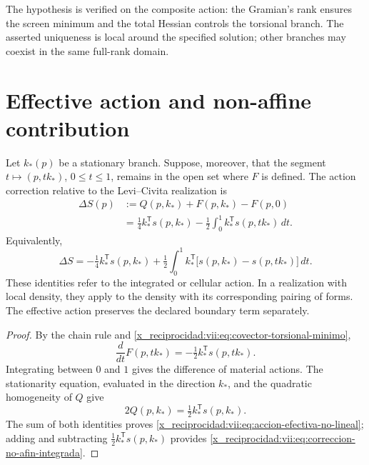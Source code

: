 The hypothesis is verified on the composite action: the Gramian's
rank ensures the screen minimum and the total Hessian controls
the torsional branch. The asserted uniqueness is local around the
specified solution; other branches may coexist in the same
full-rank domain.

\section{Effective action and non-affine contribution}
\label{x_reciprocidad:vii:subsec:accion-efectiva-no-afin}

\begin{theorem}
\label{x_reciprocidad:vii:thm:eliminacion-torsional-no-lineal}
Let \(k_*(p)\) be a stationary branch. Suppose, moreover, that the
segment \(t\mapsto (p,tk_*)\), \(0\leq t\leq1\), remains
in the open set where \(F\) is defined. The action correction
relative to the Levi--Civita realization is
\begin{equation}
 \begin{split}
 \Delta S(p)
  &:=Q(p,k_*)+F(p,k_*)-F(p,0)\\
  &=\tfrac14 k_*^{\mathsf T}s(p,k_*)
     -\tfrac12\int_0^1
           k_*^{\mathsf T}s(p,tk_*)\,dt.
 \end{split}
 \label{x_reciprocidad:vii:eq:accion-efectiva-no-lineal}
\end{equation}
Equivalently,
\begin{equation}
 \Delta S=-\tfrac14 k_*^{\mathsf T}s(p,k_*)
  +\tfrac12\int_0^1 k_*^{\mathsf T}
       \bigl[s(p,k_*)-s(p,tk_*)\bigr]\,dt.
 \label{x_reciprocidad:vii:eq:correccion-no-afin-integrada}
\end{equation}
These identities refer to the integrated or cellular action.
In a realization with local density, they apply to the density
with its corresponding pairing of forms. The effective action
preserves the declared boundary term separately.
\end{theorem}

\begin{proof}
By the chain rule and
\eqref{x_reciprocidad:vii:eq:covector-torsional-minimo},
\[
 \frac{d}{dt}F(p,tk_*)
      =-\tfrac12 k_*^{\mathsf T}s(p,tk_*).
\]
Integrating between \(0\) and \(1\) gives the difference of material
actions. The stationarity equation, evaluated in the
direction \(k_*\), and the quadratic homogeneity of \(Q\) give
\[
 2Q(p,k_*)=\tfrac12 k_*^{\mathsf T}s(p,k_*).
\]
The sum of both identities proves
\eqref{x_reciprocidad:vii:eq:accion-efectiva-no-lineal}; adding and subtracting
\(\tfrac12k_*^{\mathsf T}s(p,k_*)\) provides
\eqref{x_reciprocidad:vii:eq:correccion-no-afin-integrada}.
\end{proof}

